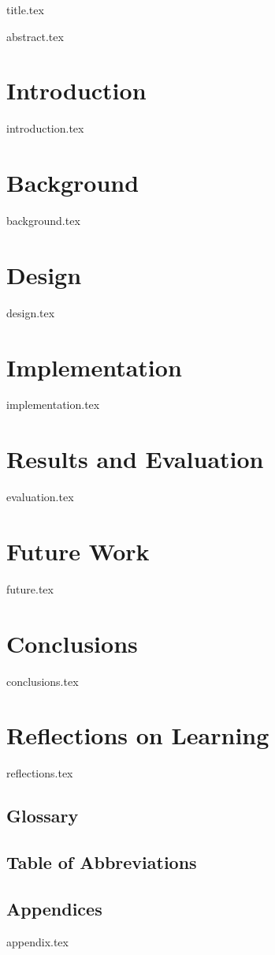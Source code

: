 \documentclass[12pt,a4paper,oneside,openright]{book}
\begin{document}
	\begin{titlepage}
		{title.tex}
	\end{titlepage}
	\restoregeometry

	\frontmatter

	{abstract.tex}

	\tableofcontents
	\listoffigures
	\listoftables

	\mainmatter

	\chapter{Introduction}
		{introduction.tex}

	\chapter{Background}
		{background.tex}

	\chapter{Design} \label{chap:design}
		{design.tex}

	\chapter{Implementation}
		{implementation.tex}

	\chapter{Results and Evaluation}
		{evaluation.tex}

	\chapter{Future Work}
		{future.tex}

	\chapter{Conclusions}
		{conclusions.tex}

	\chapter{Reflections on Learning}
		{reflections.tex}

	\backmatter
	\section*{Glossary}
	\section*{Table of Abbreviations}
	\section*{Appendices}
		{appendix.tex}

	\printbibliography
\end{document}
